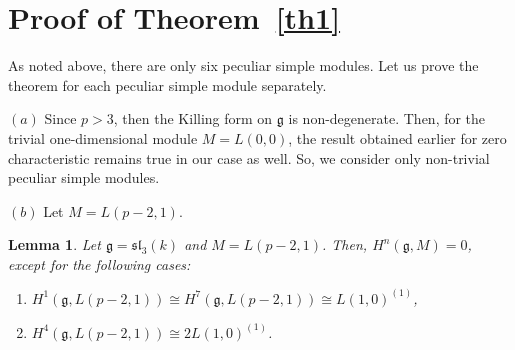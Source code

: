 \documentclass[pdftex]{sigma}%
\numberwithin{equation}{section}
\newtheorem{Lemma}[Theorem]{Lemma}
\begin{document}
\section{Proof of Theorem~\ref{th1}}%

As noted above, there are only six peculiar simple modules. Let us prove the theorem for each peculiar simple module separately.

 $(a)$ Since $p>3$, then the Killing form on $\mathfrak{g}$ is non-degenerate. Then, for the trivial one-dimensional module $M=L(0,0)$, the result obtained earlier for zero characteristic remains true in our case as well. So, we consider only non-trivial peculiar simple modules.

$(b)$ Let $M=L(p-2,1)$.

\begin{Lemma}\label{l1}
Let $\mathfrak{g}=\mathfrak{sl}_3(k)$ and $M=L(p-2,1)$. Then, $H^n(\mathfrak{g},M)=0$, except for the following cases:
\begin{enumerate}\itemsep=0pt
\item[$(i)$] $H^1(\mathfrak{g},L(p-2,1))\cong H^7(\mathfrak{g},L(p-2,1))\cong L(1,0)^{(1)}$,
\item[$(ii)$] $H^4(\mathfrak{g},L(p-2,1))\cong 2L(1,0)^{(1)}$.
\end{enumerate}
\end{Lemma}
\end{document}
